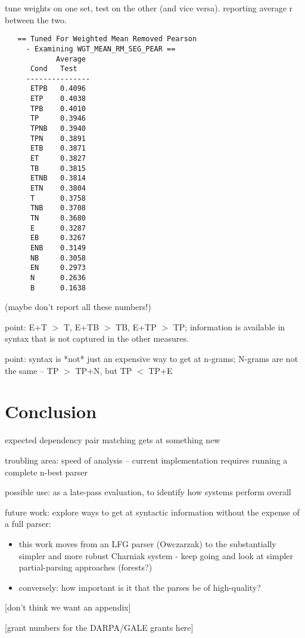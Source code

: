 \documentclass{kluwer}    %
\begin{document}
\begin{article}
tune weights on one set, test on the other (and vice versa).
reporting average r between the two.

\begin{verbatim}
   == Tuned For Weighted Mean Removed Pearson
     - Examining WGT_MEAN_RM_SEG_PEAR ==
            Average
      Cond   Test  
     ---------------
      ETPB   0.4096
      ETP    0.4038
      TPB    0.4010
      TP     0.3946
      TPNB   0.3940
      TPN    0.3891
      ETB    0.3871
      ET     0.3827
      TB     0.3815
      ETNB   0.3814
      ETN    0.3804
      T      0.3758
      TNB    0.3708
      TN     0.3680
      E      0.3287
      EB     0.3267
      ENB    0.3149
      NB     0.3058
      EN     0.2973
      N      0.2636
      B      0.1638
\end{verbatim}
(maybe don't report all these numbers!)
  
point: E+T $>$ T, E+TB $>$ TB, E+TP $>$ TP; information is available in
syntax that is not captured in the other measures.

point: syntax is *not* just an expensive way to get at n-grams;
N-grams are not the same -- TP $>$ TP+N, but TP $<$ TP+E

\section{Conclusion}

expected dependency pair matching gets at something new

troubling area: speed of analysis -- current implementation requires
running a complete n-best parser

possible use: as a late-pass evaluation, to identify how systems
perform overall

future work:  explore ways to get at syntactic information without
the expense of a full parser:
\begin{itemize}
\item this work moves from an LFG parser (Owczarzak) to the
  substantially simpler and more robust Charniak system - keep going
  and look at simpler partial-parsing approaches (forests?)
\item conversely: how important is it that the parses be of
  high-quality?
\end{itemize}





\appendix

[don't think we want an appendix]


\acknowledgements

[grant numbers for the DARPA/GALE grants here]






\end{article}
\end{document}
